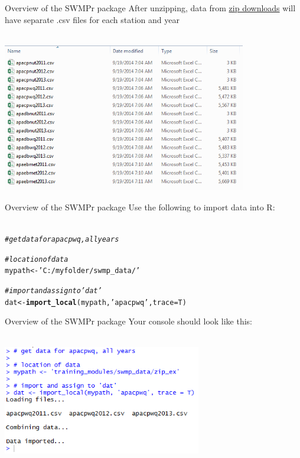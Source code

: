 \documentclass[xcolor=svgnames]{beamer}\usepackage[]{graphicx}\usepackage[]{color}
\makeatletter
\newcommand{\hlstr}[1]{\textcolor[rgb]{0.192,0.494,0.8}{#1}}%
\newcommand{\hlcom}[1]{\textcolor[rgb]{0.678,0.584,0.686}{\textit{#1}}}%
\newcommand{\hlstd}[1]{\textcolor[rgb]{0.345,0.345,0.345}{#1}}%
\newcommand{\hlkwb}[1]{\textcolor[rgb]{0.69,0.353,0.396}{#1}}%
\newcommand{\hlkwc}[1]{\textcolor[rgb]{0.333,0.667,0.333}{#1}}%
\newcommand{\hlkwd}[1]{\textcolor[rgb]{0.737,0.353,0.396}{\textbf{#1}}}%
\newenvironment{kframe}{%
 \def\at@end@of@kframe{}%
 \ifinner\ifhmode%
  \def\at@end@of@kframe{\end{minipage}}%
  \begin{minipage}{\columnwidth}%
 \fi\fi%
 \def\FrameCommand##1{\hskip\@totalleftmargin \hskip-\fboxsep
 \colorbox{shadecolor}{##1}\hskip-\fboxsep
     \hskip-\linewidth \hskip-\@totalleftmargin \hskip\columnwidth}%
 \MakeFramed {\advance\hsize-\width
   \@totalleftmargin\z@ \linewidth\hsize
   \@setminipage}}%
 {\par\unskip\endMakeFramed%
 \at@end@of@kframe}
\newenvironment{knitrout}{}{} %
\makeatother
\begin{document}
\begin{frame}{Overview of the SWMPr package}
After unzipping, data from \href{http://cdmo.baruch.sc.edu/aqs/zips.cfm}{zip downloads} will have separate .csv files for each station and year\\~\\
\centerline{\includegraphics[width = 0.8\textwidth]{zips_ex.png}}
\end{frame}

\begin{frame}[fragile]{Overview of the SWMPr package}
Use the following to import data into R:\\~\\
\begin{knitrout}
\color{fgcolor}\begin{kframe}
\begin{alltt}
\hlcom{# get data for apacpwq, all years}

\hlcom{# location of data}
\hlstd{mypath} \hlkwb{<-} \hlstr{'C:/myfolder/swmp_data/'}

\hlcom{# import and assign to 'dat'}
\hlstd{dat} \hlkwb{<-} \hlkwd{import_local}\hlstd{(mypath,} \hlstr{'apacpwq'}\hlstd{,} \hlkwc{trace} \hlstd{= T)}
\end{alltt}
\end{kframe}
\end{knitrout}
\end{frame}

\begin{frame}[fragile]{Overview of the SWMPr package}
Your console should look like this:\\~\\
\centerline{\includegraphics[width = 0.65\textwidth]{import_ex.png}}
\end{frame}
\end{document}
